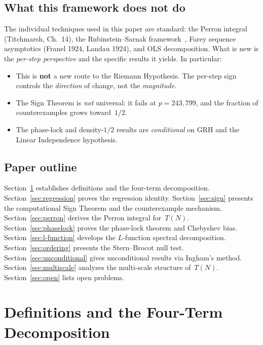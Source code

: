 \documentclass[11pt]{article}
\theoremstyle{definition}
\begin{document}
\subsection{What this framework does not do}\label{sec:intro-honest}

The individual techniques used in this paper are standard: the Perron
integral (Titchmarsh, Ch.~14), the Rubinstein--Sarnak framework~\cite{RubinsteinSarnak1994},
Farey sequence asymptotics (Franel 1924, Landau 1924), and OLS
decomposition.  What is new is the \emph{per-step perspective} and the
specific results it yields.  In particular:

\begin{itemize}
  \item This is \textbf{not} a new route to the Riemann Hypothesis.
    The per-step sign controls the \emph{direction} of change, not
    the \emph{magnitude}.
  \item The Sign Theorem is \emph{not} universal: it fails at
    $p = 243{,}799$, and the fraction of counterexamples grows
    toward~$1/2$.
  \item The phase-lock and density-$1/2$ results are
    \emph{conditional} on GRH and the Linear Independence hypothesis.
\end{itemize}

\subsection{Paper outline}

Section~\ref{sec:defs} establishes definitions and the four-term
decomposition.
Section~\ref{sec:regression} proves the regression identity.
Section~\ref{sec:sign} presents the computational Sign Theorem and
the counterexample mechanism.
Section~\ref{sec:perron} derives the Perron integral for~$T(N)$.
Section~\ref{sec:phaselock} proves the phase-lock theorem and
Chebyshev bias.
Section~\ref{sec:l-function} develops the $L$-function spectral
decomposition.
Section~\ref{sec:ordering} presents the Stern--Brocot null test.
Section~\ref{sec:unconditional} gives unconditional results via
Ingham's method.
Section~\ref{sec:multiscale} analyzes the multi-scale structure
of~$T(N)$.
Section~\ref{sec:open} lists open problems.



\section{Definitions and the Four-Term Decomposition}\label{sec:defs}
\end{document}
